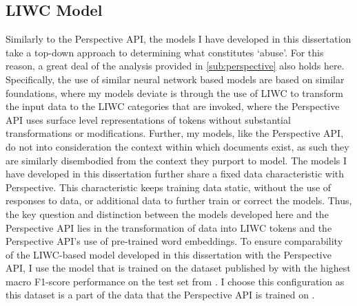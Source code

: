 \subsection{LIWC Model}

Similarly to the Perspective API, the models I have developed in this dissertation take a top-down approach to determining what constitutes `abuse'. For this reason, a great deal of the analysis provided in \autoref{sub:perspective} also holds here. Specifically, the use of similar neural network based models are based on similar foundations, where my models deviate is through the use of LIWC \cite{Tausczik:2010} to transform the input data to the LIWC categories that are invoked, where the Perspective API uses surface level representations of tokens without substantial transformations or modifications. Further, my models, like the Perspective API, do not into consideration the context within which documents exist, as such they are similarly disembodied from the context they purport to model. The models I have developed in this dissertation further share a fixed data characteristic with Perspective. This characteristic keeps training data static, without the use of responses to data, or additional data to further train or correct the models. Thus, the key question and distinction between the models developed here and the Perspective API lies in the transformation of data into LIWC tokens and the Perspective API's use of pre-trained word embeddings. To ensure comparability of the LIWC-based model developed in this dissertation with the Perspective API, I use the model that is trained on the dataset published by \citet{Wulczyn:2017} with the highest macro F1-score performance on the test set from \citet{Wulczyn:2017}. I choose this configuration as this dataset is a part of the data that the Perspective API is trained on \citep{Perspective:Github}.\vspace{5mm}

